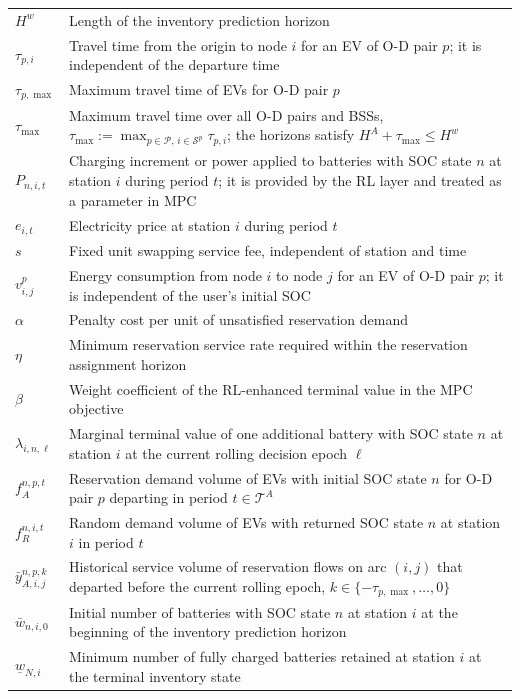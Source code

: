 \documentclass[12pt,hyperref,a4paper,UTF8]{ctexart}
\begin{document}
\begin{table}[!htbp]
\begin{tabular}{@{}lp{13cm}@{}}
    $H^w$ & Length of the inventory prediction horizon \\
    $\tau_{p,i}$ & Travel time from the origin to node $i$ for an EV of O-D pair $p$; it is independent of the departure time \\
    $\tau_{p,\max}$ & Maximum travel time of EVs for O-D pair $p$ \\
    $\tau_{\max}$ & Maximum travel time over all O-D pairs and BSSs, $\tau_{\max}:=\max_{p\in\mathcal{P},\,i\in\mathcal{S}^{p}}\tau_{p,i}$; the horizons satisfy $H^A+\tau_{\max}\le H^w$ \\
    $P_{n,i,t}$ & Charging increment or power applied to batteries with SOC state $n$ at station $i$ during period $t$; it is provided by the RL layer and treated as a parameter in MPC \\
    $e_{i,t}$ & Electricity price at station $i$ during period $t$ \\
    $s$ & Fixed unit swapping service fee, independent of station and time \\
    $v^{p}_{i,j}$ & Energy consumption from node $i$ to node $j$ for an EV of O-D pair $p$; it is independent of the user's initial SOC \\
    $\alpha$ & Penalty cost per unit of unsatisfied reservation demand \\
    $\eta$ & Minimum reservation service rate required within the reservation assignment horizon \\
    $\beta$ & Weight coefficient of the RL-enhanced terminal value in the MPC objective \\
    $\lambda_{i,n,\ell}$ & Marginal terminal value of one additional battery with SOC state $n$ at station $i$ at the current rolling decision epoch $\ell$ \\
    $f_{A}^{n,p,t}$ & Reservation demand volume of EVs with initial SOC state $n$ for O-D pair $p$ departing in period $t\in\mathcal{T}^{A}$ \\
    $f_{R}^{n,i,t}$ & Random demand volume of EVs with returned SOC state $n$ at station $i$ in period $t$ \\
    $\bar{y}_{A,i,j}^{n,p,k}$ & Historical service volume of reservation flows on arc $(i,j)$ that departed before the current rolling epoch, $k\in\{-\tau_{p,\max},\dots,0\}$ \\
    $\bar{w}_{n,i,0}$ & Initial number of batteries with SOC state $n$ at station $i$ at the beginning of the inventory prediction horizon \\
    $\underline{w}_{N,i}$ & Minimum number of fully charged batteries retained at station $i$ at the terminal inventory state \\

\end{tabular}
\end{table}
\end{document}
